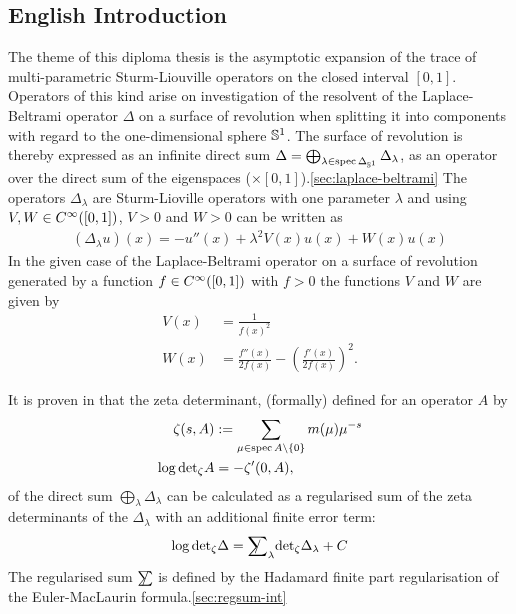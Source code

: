 \subsection{English Introduction}
The theme of this diploma thesis is the asymptotic expansion of the trace of
multi-parametric Sturm-Liouville operators on the closed interval $[0,1]$.
%
Operators of this kind arise on investigation of the resolvent of the
Laplace-Beltrami operator $\Delta$ on a surface of revolution when splitting it
into components with regard to the one-dimensional sphere ${\mathbb{S}^{1}}$. The
surface of revolution is thereby expressed as an infinite direct sum $\Delta =
\bigoplus_{\lambda\in\operatorname{spec}\Delta_{{\mathbb{S}^{1}}}}\Delta_\lambda$, as an
operator over the direct sum of the eigenspaces
($\times[0,1]$).\ref{sec:laplace-beltrami}
%
The operators $\Delta_\lambda$ are Sturm-Lioville operators with one parameter
$\lambda$ and using $V,W\in C^\infty_{}([0,1])$, $V>0$ and $W>0$ can be written as
\begin{align*}
  (\Delta_\lambda u)(x) = -u''(x) + \lambda^2 V(x) u(x) + W(x) u(x)
\end{align*}
In the given case of the Laplace-Beltrami operator on a surface of revolution
generated by a function $f\in C^\infty_{}([0,1])$ with $f>0$ the functions $V$ and $W$
are given by
\begin{align*}
  V(x) &= \frac1{f(x)^2} \\
  W(x) &= \frac{f''(x)}{2f(x)} - \left(\frac{f'(x)}{2f(x)}\right)^2.
\end{align*}

It is proven in \cite{LV13} that the zeta determinant, (formally) defined for an
operator $A$ by
\begin{align*}
  \zeta(s,A) &:= \sum_{\mu\in\operatorname{spec}A\setminus\{0\}} m(\mu)\mu^{-s}
  \\
  \log{\det}_\zeta A &= -\zeta'(0,A),
\end{align*}
of the direct sum $\bigoplus_\lambda\Delta_\lambda$ can be calculated as a
regularised sum of the zeta determinants of the $\Delta_\lambda$ with an
additional finite error term:
\begin{align*}
  \log{\det}_\zeta\Delta = \slashed{\sum}_\lambda{\det}_\zeta\Delta_\lambda + C
\end{align*}
The regularised sum $\slashed{\sum}$ is defined by the Hadamard finite part
regularisation of the Euler-MacLaurin formula.\ref{sec:regsum-int}

